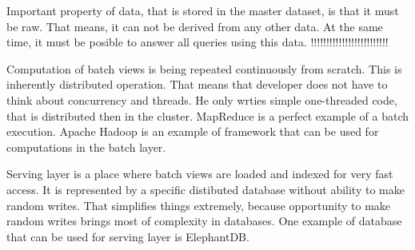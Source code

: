Important property of data, that is stored in the master dataset, is that it
must be raw.
That means, it can not be derived from any other data.
At the same time, it must be posible to answer all queries using this data.
!!!!!!!!!!!!!!!!!!!!!!!!!

Computation of batch views is being repeated continuously from scratch.
This is inherently distributed operation.
That means that developer does not have to think about concurrency and threads.
He only wrties simple one-threaded code, that is distributed then in the
cluster.
MapReduce is a perfect example of a batch execution.
Apache Hadoop is an example of framework that can be used for computations in
the batch layer.


Serving layer is a place where batch views are loaded and indexed for very fast
access.
It is represented by a specific distibuted database without ability to make random writes.
That simplifies things extremely, because opportunity to make random writes
brings most of complexity in databases.
One example of database that can be used for serving layer is ElephantDB.


